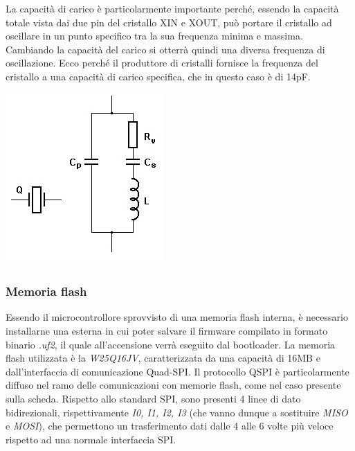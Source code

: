 \noindent La capacità di carico è particolarmente importante perché, essendo la
capacità totale vista dai due pin del cristallo XIN e XOUT, può portare
il cristallo ad oscillare in un punto specifico tra la sua frequenza
minima e massima. Cambiando la capacità del carico si otterrà quindi una
diversa frequenza di oscillazione. Ecco perché il produttore di
cristalli fornisce la frequenza del cristallo a una capacità di carico
specifica, che in questo caso è di 14pF.

\begin{center}
\includegraphics[scale=0.75]{figures/image28.png}
\captionsetup{type=figure}
\end{center}

\hypertarget{memoria-flash}{%
\subsubsection{\texorpdfstring{\hfill\break
Memoria flash}{ Memoria flash}}\label{memoria-flash}}

Essendo il microcontrollore sprovvisto di una memoria flash interna, 
è necessario installarne una esterna in cui poter salvare il firmware compilato in formato
binario \emph{.uf2}, il quale all'accensione verrà eseguito dal bootloader. La
memoria flash utilizzata è la \emph{W25Q16JV}, caratterizzata da una capacità di 16MB e dall’interfaccia di comunicazione Quad-SPI.
Il protocollo QSPI è particolarmente diffuso nel ramo delle comunicazioni con memorie flash,
come nel caso presente sulla scheda. Rispetto allo standard SPI, sono
presenti 4 linee di dato bidirezionali, rispettivamente \emph{I0, I1,
I2, I3} (che vanno dunque a sostituire \emph{MISO} e \emph{MOSI}), che
permettono un trasferimento dati dalle 4 alle 6 volte più veloce
rispetto ad una normale interfaccia SPI.

